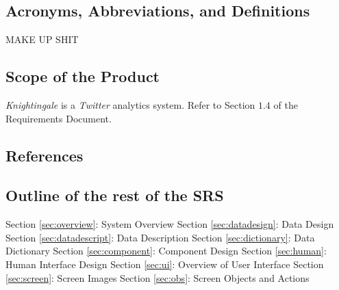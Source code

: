 \documentclass[a4paper, 12pt]{article}
\begin{document}
\subsection{Acronyms, Abbreviations, and Definitions} \label{sec:abbr}
\begin{adjustwidth}{2em}{0pt}
MAKE UP SHIT
\end{adjustwidth}

\subsection{Scope of the Product} \label{sec:scope}
\begin{adjustwidth}{2em}{0pt}
\textit{Knightingale} is a \textit{Twitter} analytics system. Refer to Section $1.4$ of the Requirements Document.
\end{adjustwidth}

\subsection{References} \label{sec:ref}
\begin{adjustwidth}{2em}{0pt}

\end{adjustwidth}

\subsection{Outline of the rest of the SRS} \label{sec:outline}
\begin{adjustwidth}{2em}{0pt}
Section \ref{sec:overview}: System Overview \newline
Section \ref{sec:datadesign}: Data Design \newline
Section \ref{sec:datadescript}: Data Description \newline
Section \ref{sec:dictionary}: Data Dictionary \newline
Section \ref{sec:component}: Component Design \newline
Section \ref{sec:human}: Human Interface Design \newline
Section \ref{sec:ui}: Overview of User Interface \newline
Section \ref{sec:screen}: Screen Images \newline
Section \ref{sec:obs}: Screen Objects and Actions \newline
\end{adjustwidth}
\end{document}
